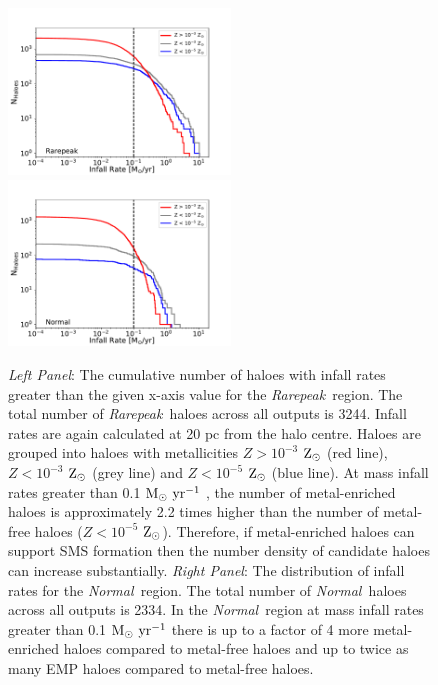 \documentclass[graphics, twocolumn, usenatbib]{mn2e}
\newcommand{\msolaryr} {$\rm{M_{\odot}~yr^{-1}}~$}
\newcommand{\zsolar} {$\rm{Z_{\odot}}~$}
\newcommand{\zsolarc} {$\rm{Z_{\odot}}$}
\newcommand{\rarepeak} {\textit{Rarepeak~}}
\newcommand{\normal} {\textit{Normal~}}
\begin{document}
\begin{figure}
\centering
\begin{minipage}{175mm}      \begin{center} 
\centerline{
\includegraphics[width=0.525\textwidth]{FIGURES/Rarepeak_NHaloes.pdf}
\includegraphics[width=0.525\textwidth]{FIGURES/Normal_NHaloes.pdf}}
\caption{\textit{Left Panel}: The cumulative number of haloes with infall rates greater than the given
  x-axis value for the \rarepeak region.  The total number of \rarepeak haloes across all outputs
  is 3244. Infall rates are again calculated at 20 pc from the halo centre.
  Haloes are grouped into haloes with metallicities $Z> 10^{-3}$ \zsolar (red line),
  $Z< 10^{-3}$ \zsolar (grey line) and  $Z< 10^{-5}$ \zsolar (blue line). At mass infall
  rates greater than 0.1 \msolaryr, the number of metal-enriched haloes is approximately 2.2 times
  higher than the number of 
  metal-free haloes ($Z< 10^{-5}$ \zsolarc). Therefore, if metal-enriched haloes can support SMS
  formation then the number density of candidate haloes can increase substantially. 
  \textit{Right Panel}: The distribution of
  infall rates for the \normal region. The  total number of \normal haloes across all outputs is 2334.
  In the \normal region at mass infall
  rates greater than 0.1 \msolaryr there is up to a factor of 4 more metal-enriched haloes compared to
  metal-free haloes and up to twice as many EMP haloes compared to metal-free haloes. 
 } \label{Fig:Histogram}
\end{center} \end{minipage}

\end{figure}
\end{document}

